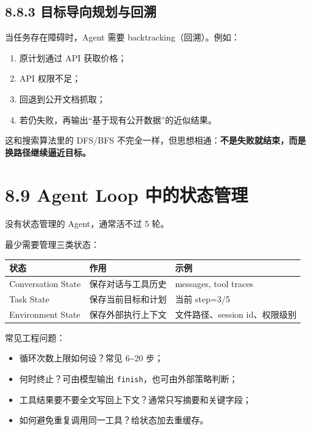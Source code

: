 \subsection{8.8.3 目标导向规划与回溯}

当任务存在障碍时，Agent 需要 backtracking（回溯）。例如：


\begin{enumerate}[leftmargin=2em]
\item 原计划通过 API 获取价格；
\item API 权限不足；
\item 回退到公开文档抓取；
\item 若仍失败，再输出``基于现有公开数据''的近似结果。
\end{enumerate}

这和搜索算法里的 DFS/BFS 不完全一样，但思想相通：\textbf{不是失败就结束，而是换路径继续逼近目标。}


\section{8.9 Agent Loop 中的状态管理}

没有状态管理的 Agent，通常活不过 5 轮。


最少需要管理三类状态：


\begingroup
\scriptsize
\setlength{\tabcolsep}{3pt}
\begin{longtable}{|p{}|p{}|p{}|}
\hline
状态 & 作用 & 示例 \\ \hline
Conversation State & 保存对话与工具历史 & messages, tool traces \\ \hline
Task State & 保存当前目标和计划 & 当前 step=3/5 \\ \hline
Environment State & 保存外部执行上下文 & 文件路径、session id、权限级别 \\ \hline
\end{longtable}
\endgroup

常见工程问题：


\begin{itemize}[leftmargin=2em]
\item 循环次数上限如何设？常见 6\textasciitilde{}20 步；
\item 何时终止？可由模型输出 \texttt{finish}，也可由外部策略判断；
\item 工具结果要不要全文写回上下文？通常只写摘要和关键字段；
\item 如何避免重复调用同一工具？给状态加去重缓存。
\end{itemize}

